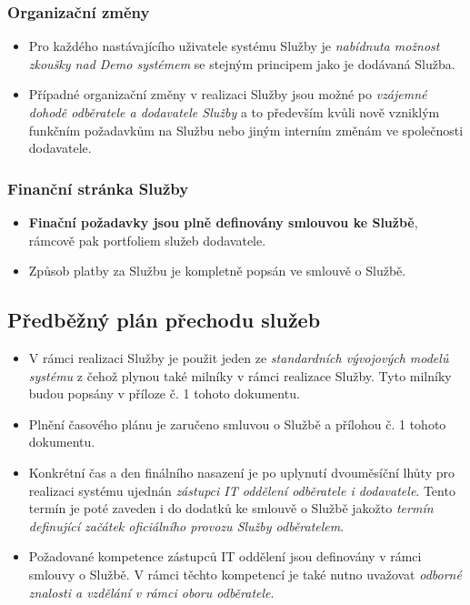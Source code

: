 \documentclass[11pt, a4paper, titlepage]{article}
\begin{document}
	\subsubsection*{Organizační změny}

	\begin{itemize}
		\item Pro každého nastávajícího uživatele systému Služby je \emph{nabídnuta možnost zkoušky nad Demo systémem} se stejným principem jako je dodávaná Služba.
		\item Případné organizační změny v realizaci Služby jsou možné po \emph{vzájemné dohodě odběratele a dodavatele Služby} a to především kvůli nově vzniklým funkčním požadavkům na Službu nebo jiným interním změnám ve společnosti dodavatele.
	\end{itemize}

	\subsubsection*{Finanční stránka Služby}

	\begin{itemize}
		\item \textbf{Finační požadavky jsou plně definovány smlouvou ke Službě}, rámcově pak portfoliem služeb dodavatele.
		\item Způsob platby za Službu je kompletně popsán ve smlouvě o Službě.
	\end{itemize}

	\subsection*{Předběžný plán přechodu služeb}

	\begin{itemize}
		\item V rámci realizaci Služby je použit jeden ze \emph{standardních vývojových modelů systému} z čehož plynou také milníky v rámci realizace Služby. Tyto milníky budou popsány v příloze č. 1 tohoto dokumentu. 
		\item Plnění časového plánu je zaručeno smluvou o Službě a přílohou č. 1 tohoto dokumentu.
		\item Konkrétní čas a den finálního nasazení je po uplynutí dvouměsíční lhůty pro realizaci systému ujednán \emph{zástupci IT oddělení odběratele i dodavatele}. Tento termín je poté zaveden i do dodatků ke smlouvě o Službě jakožto \emph{termín definující začátek oficiálního provozu Služby odběratelem}.
		\item Požadované kompetence zástupců IT oddělení jsou definovány v rámci smlouvy o Službě. V rámci těchto kompetencí je také nutno uvažovat \emph{odborné znalosti a vzdělání v rámci oboru odběratele}. 
	\end{itemize}
\end{document}
